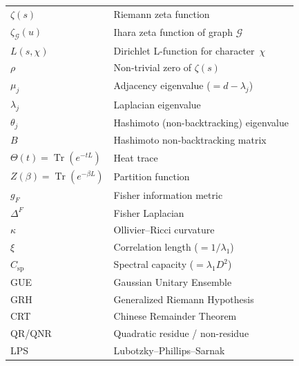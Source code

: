 \documentclass[12pt,reqno]{amsart}
\theoremstyle{plain}
\theoremstyle{definition}
\theoremstyle{remark}
\DeclareMathOperator{\Tr}{Tr}
\begin{document}
\begin{tabular}{ll}
  $\zeta(s)$ & Riemann zeta function \\
  $\zeta_\mathcal{G}(u)$ & Ihara zeta function of graph $\mathcal{G}$ \\
  $L(s,\chi)$ & Dirichlet L-function for character~$\chi$ \\
  $\rho$ & Non-trivial zero of $\zeta(s)$ \\
  $\mu_j$ & Adjacency eigenvalue ($= d - \lambda_j$) \\
  $\lambda_j$ & Laplacian eigenvalue \\
  $\theta_j$ & Hashimoto (non-backtracking) eigenvalue \\
  $B$ & Hashimoto non-backtracking matrix \\
  $\Theta(t) = \Tr(e^{-tL})$ & Heat trace \\
  $Z(\beta) = \Tr(e^{-\beta L})$ & Partition function \\
  $g_F$ & Fisher information metric \\
  $\Delta^F$ & Fisher Laplacian \\
  $\kappa$ & Ollivier--Ricci curvature \\
  $\xi$ & Correlation length ($= 1/\lambda_1$) \\
  $C_{\mathrm{sp}}$ & Spectral capacity ($= \lambda_1 D^2$) \\
  GUE & Gaussian Unitary Ensemble \\
  GRH & Generalized Riemann Hypothesis \\
  CRT & Chinese Remainder Theorem \\
  QR/QNR & Quadratic residue / non-residue \\
  LPS & Lubotzky--Phillips--Sarnak \\
\end{tabular}


\end{document}
